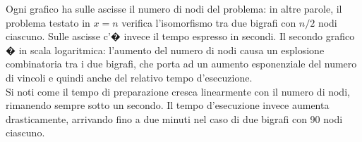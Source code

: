 Ogni grafico ha sulle ascisse il numero di nodi del problema: in altre parole, il problema testato in $x=n$ verifica l'isomorfismo tra due bigrafi con $n/2$ nodi ciascuno. Sulle ascisse c'� invece il tempo espresso in secondi. Il secondo grafico � in scala logaritmica: l'aumento del numero di nodi causa un esplosione combinatoria tra i due bigrafi, che porta ad un aumento esponenziale del numero di vincoli e quindi anche del relativo tempo d'esecuzione.\\

Si noti come il tempo di preparazione cresca linearmente con il numero di nodi, rimanendo sempre sotto un secondo. Il tempo d'esecuzione invece aumenta drasticamente, arrivando fino a due minuti nel caso di due bigrafi con 90 nodi ciascuno.





